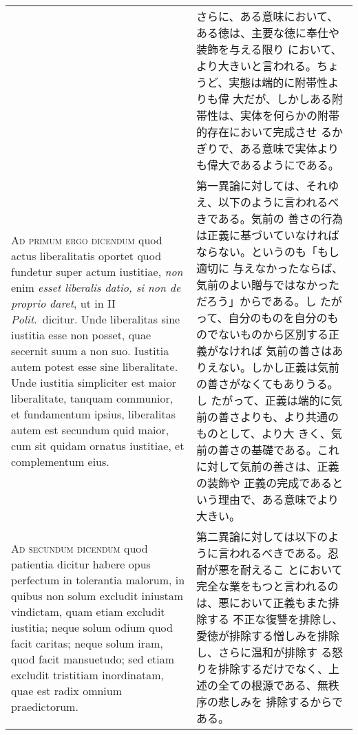 \documentclass[10pt]{jsarticle}
\begin{document}
\begin{longtable}{p{21em}p{21em}}
&

 さらに、ある意味において、ある徳は、主要な徳に奉仕や装飾を与える限り
 において、より大きいと言われる。ちょうど、実態は端的に附帯性よりも偉
 大だが、しかしある附帯性は、実体を何らかの附帯的存在において完成させ
 るかぎりで、ある意味で実体よりも偉大であるようにである。

\\



{\scshape Ad primum ergo dicendum} quod actus liberalitatis oportet
quod fundetur super actum iustitiae, {\itshape non} enim {\itshape
esset liberalis datio, si non de proprio daret}, ut in II {\itshape
Polit}.~dicitur. Unde liberalitas sine iustitia esse non posset, quae
secernit suum a non suo. Iustitia autem potest esse sine
liberalitate. Unde iustitia simpliciter est maior liberalitate,
tanquam communior, et fundamentum ipsius, liberalitas autem est
secundum quid maior, cum sit quidam ornatus iustitiae, et complementum
eius.


&

 第一異論に対しては、それゆえ、以下のように言われるべきである。気前の
 善さの行為は正義に基づいていなければならない。というのも「もし適切に
 与えなかったならば、気前のよい贈与ではなかっただろう」からである。し
 たがって、自分のものを自分のものでないものから区別する正義がなければ
 気前の善さはありえない。しかし正義は気前の善さがなくてもありうる。し
 たがって、正義は端的に気前の善さよりも、より共通のものとして、より大
 きく、気前の善さの基礎である。これに対して気前の善さは、正義の装飾や
 正義の完成であるという理由で、ある意味でより大きい。

\\



{\scshape Ad secundum dicendum} quod patientia dicitur habere opus
perfectum in tolerantia malorum, in quibus non solum excludit iniustam
vindictam, quam etiam excludit iustitia; neque solum odium quod facit
caritas; neque solum iram, quod facit mansuetudo; sed etiam excludit
tristitiam inordinatam, quae est radix omnium praedictorum.


&

 第二異論に対しては以下のように言われるべきである。忍耐が悪を耐えるこ
 とにおいて完全な業をもつと言われるのは、悪において正義もまた排除する
 不正な復讐を排除し、愛徳が排除する憎しみを排除し、さらに温和が排除す
 る怒りを排除するだけでなく、上述の全ての根源である、無秩序の悲しみを
 排除するからである。

\\




\end{longtable}
\end{document}
